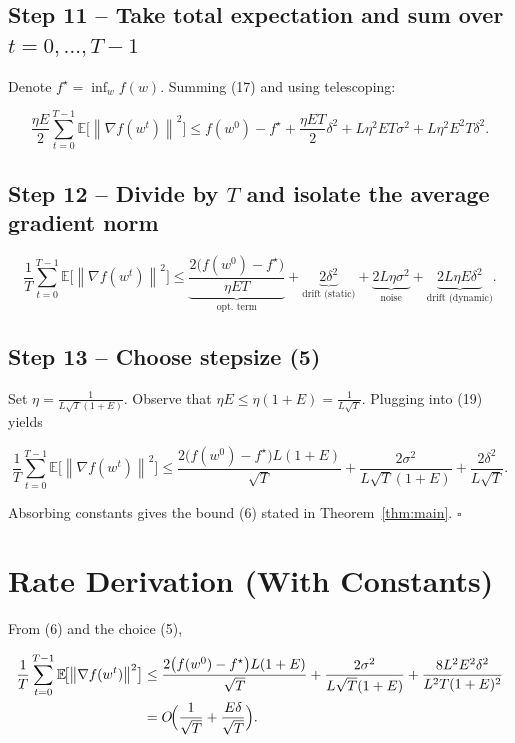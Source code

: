 \documentclass{article}
\newcommand{\E}{\mathbb{E}}
\newcommand{\norm}[1]{\left\|#1\right\|}
\begin{document}
\subsection*{Step 11 – Take total expectation and sum over $t=0,\dots,T-1$}
Denote $f^{\star}= \inf_{w} f(w)$.  Summing (17) and using telescoping:

\[
\frac{\eta E}{2}\sum_{t=0}^{T-1}\E\!\bigl[\norm{\nabla f(w^{t})}^{2}\bigr]
\le f(w^{0})-f^{\star}
   +\frac{\eta E T}{2}\delta^{2}
   +L\eta^{2}ET\sigma^{2}
   +L\eta^{2}E^{2}T\delta^{2}.
\tag{18}
\]

\subsection*{Step 12 – Divide by $T$ and isolate the average gradient norm}
\[
\frac{1}{T}\sum_{t=0}^{T-1}\E\!\bigl[\norm{\nabla f(w^{t})}^{2}\bigr]
\le
\underbrace{\frac{2\bigl(f(w^{0})-f^{\star}\bigr)}{\eta E T}}_{\displaystyle\text{opt. term}}
+ \underbrace{2\delta^{2}}_{\displaystyle\text{drift (static)}}
+ \underbrace{2L\eta\sigma^{2}}_{\displaystyle\text{noise}}
+ \underbrace{2L\eta E\delta^{2}}_{\displaystyle\text{drift (dynamic)}} .
\tag{19}
\]

\subsection*{Step 13 – Choose stepsize (5)}
Set $\eta = \frac{1}{L\sqrt{T}(1+E)}$.  Observe that $\eta E\le \eta (1+E)=\frac{1}{L\sqrt{T}}$.
Plugging into (19) yields

\[
\frac{1}{T}\sum_{t=0}^{T-1}\E\!\bigl[\norm{\nabla f(w^{t})}^{2}\bigr]
\le
\frac{2\bigl(f(w^{0})-f^{\star}\bigr)L(1+E)}{\sqrt{T}}
+ \frac{2\sigma^{2}}{L\sqrt{T}(1+E)}
+ \frac{2\delta^{2}}{L\sqrt{T}} .
\]

Absorbing constants gives the bound (6) stated in Theorem~\ref{thm:main}.
\hfill $\square$

\section*{Rate Derivation (With Constants)}
From (6) and the choice (5),

\[
\begin{aligned}
\frac{1}{T}\sum_{t=0}^{T-1}\E\!\bigl[\norm{\nabla f(w^{t})}^{2}\bigr]
&\le
\frac{2\bigl(f(w^{0})-f^{\star}\bigr)L(1+E)}{\sqrt{T}}
+ \frac{2\sigma^{2}}{L\sqrt{T}(1+E)}
+ \frac{8L^{2}E^{2}\delta^{2}}{L^{2}T(1+E)^{2}}  \\
&= O\!\Bigl(\frac{1}{\sqrt{T}} + \frac{E\delta}{\sqrt{T}}\Bigr).
\end{aligned}
\]
\end{document}

